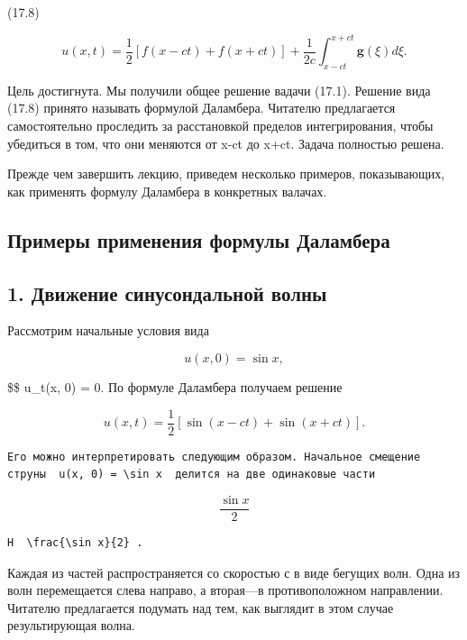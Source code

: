 \documentclass[
  ukrainian,
]{article}
\begin{document}
(17.8)

\[
u(x, t) = \frac{1}{2} \left[ f(x-ct) + f(x+ct) \right] + \frac{1}{2c} \int_{x-ct}^{x+ct} \mathbf{g}(\xi) d\xi.
\]

Цель достигнута. Мы получили общее решение вадачи (17.1). Решение вида
(17.8) принято называть формулой Даламбера. Читателю предлагается
самостоятельно проследить за расстановкой пределов интегрирования, чтобы
убедиться в том, что они меняются от x-ct до x+ct. Задача полностью
решена.

Прежде чем завершить лекцию, приведем несколько примеров, показывающих,
как применять формулу Даламбера в конкретных валачах.

\subsection{Примеры применения формулы
Даламбера}\label{ux43fux440ux438ux43cux435ux440ux44b-ux43fux440ux438ux43cux435ux43dux435ux43dux438ux44f-ux444ux43eux440ux43cux443ux43bux44b-ux434ux430ux43bux430ux43cux431ux435ux440ux430}

\subsection{1. Движение синусондальной
волны}\label{ux434ux432ux438ux436ux435ux43dux438ux435-ux441ux438ux43dux443ux441ux43eux43dux434ux430ux43bux44cux43dux43eux439-ux432ux43eux43bux43dux44b}

Рассмотрим начальные условия вида

\[
u(x, 0) = \sin x,
\]

\$\$ u\_t(x, 0) = 0. По формуле Даламбера получаем решение

\[
u(x, t) = \frac{1}{2} [\sin(x-ct) + \sin(x+ct)].
\]

\begin{verbatim}
Его можно интерпретировать следующим образом. Начальное смещение струны  u(x, 0) = \sin x  делится на две одинаковые части
\end{verbatim}

\[
\frac{\sin x}{2}
\]

\begin{verbatim}
H  \frac{\sin x}{2} .
\end{verbatim}

Каждая из частей распространяется со скоростью с в виде бегущих волн.
Одна из волн перемещается слева направо, а вторая---в противоположном
направлении. Читателю предлагается подумать над тем, как выглядит в этом
случае результирующая волна.
\end{document}
